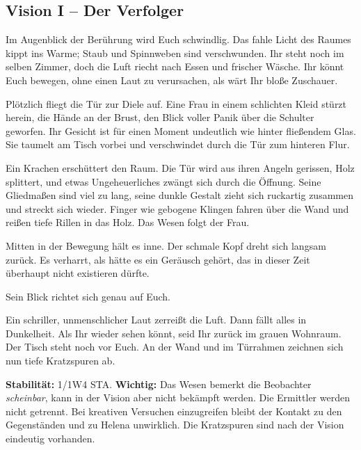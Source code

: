 \subsection{Vision I -- Der Verfolger}
\begin{vorlesetextalle}
Im Augenblick der Berührung wird Euch schwindlig. Das fahle Licht des Raumes kippt ins Warme; Staub und Spinnweben sind verschwunden. Ihr steht noch im selben Zimmer, doch die Luft riecht nach Essen und frischer Wäsche. Ihr könnt Euch bewegen, ohne einen Laut zu verursachen, als wärt Ihr blo\ss{}e Zuschauer.

Plötzlich fliegt die Tür zur Diele auf. Eine Frau in einem schlichten Kleid stürzt herein, die Hände an der Brust, den Blick voller Panik über die Schulter geworfen. Ihr Gesicht ist für einen Moment undeutlich wie hinter flie\ss{}endem Glas. Sie taumelt am Tisch vorbei und verschwindet durch die Tür zum hinteren Flur.

Ein Krachen erschüttert den Raum. Die Tür wird aus ihren Angeln gerissen, Holz splittert, und etwas Ungeheuerliches zwängt sich durch die Öffnung. Seine Gliedma\ss{}en sind viel zu lang, seine dunkle Gestalt zieht sich ruckartig zusammen und streckt sich wieder. Finger wie gebogene Klingen fahren über die Wand und rei\ss{}en tiefe Rillen in das Holz. Das Wesen folgt der Frau.

Mitten in der Bewegung hält es inne. Der schmale Kopf dreht sich langsam zurück. Es verharrt, als hätte es ein Geräusch gehört, das in dieser Zeit überhaupt nicht existieren dürfte.

Sein Blick richtet sich genau auf Euch.

Ein schriller, unmenschlicher Laut zerrei\ss{}t die Luft. Dann fällt alles in Dunkelheit. Als Ihr wieder sehen könnt, seid Ihr zurück im grauen Wohnraum. Der Tisch steht noch vor Euch. An der Wand und im Türrahmen zeichnen sich nun tiefe Kratzspuren ab.
\end{vorlesetextalle}
\begin{meisterinfo}
\textbf{Stabilität:} 1/1W4 STA. \textbf{Wichtig:} Das Wesen bemerkt die Beobachter \emph{scheinbar}, kann in der Vision aber nicht bekämpft werden. Die Ermittler werden nicht getrennt. Bei kreativen Versuchen einzugreifen bleibt der Kontakt zu den Gegenständen und zu Helena unwirklich. Die Kratzspuren sind nach der Vision eindeutig vorhanden.
\end{meisterinfo}


